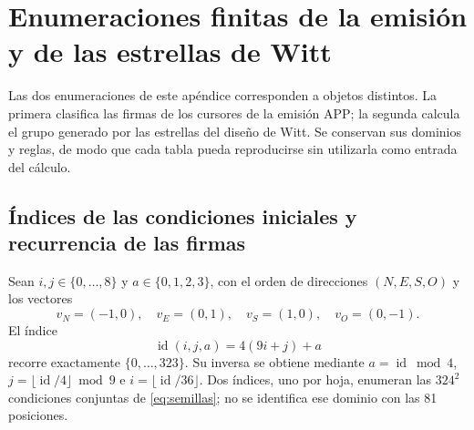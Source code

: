 \section{Enumeraciones finitas de la emisión y de las estrellas de Witt}
\label{iv:apendice-enumeraciones}

Las dos enumeraciones de este apéndice corresponden a objetos distintos.
La primera clasifica las firmas de los cursores de la emisión APP;
la segunda calcula el grupo generado por las estrellas del diseño de Witt.
Se conservan sus dominios y reglas, de modo que cada tabla pueda
reproducirse sin utilizarla como entrada del cálculo.

\subsection{Índices de las condiciones iniciales y recurrencia de las firmas}
\label{iv:apendice-firmas}

Sean \(i,j\in\{0,\ldots,8\}\) y \(a\in\{0,1,2,3\}\), con el orden
de direcciones \((N,E,S,O)\) y los vectores
\[
 v_N=(-1,0),\quad v_E=(0,1),\quad
 v_S=(1,0),\quad v_O=(0,-1).
\]
El índice
\[
 \operatorname{id}(i,j,a)=4(9i+j)+a
\]
recorre exactamente \(\{0,\ldots,323\}\). Su inversa se obtiene
mediante \(a=\operatorname{id}\bmod4\),
\(j=\lfloor\operatorname{id}/4\rfloor\bmod9\) e
\(i=\lfloor\operatorname{id}/36\rfloor\).
Dos índices, uno por hoja, enumeran las \(324^2\) condiciones conjuntas
de \eqref{eq:semillas}; no se identifica ese dominio con las 81 posiciones.

